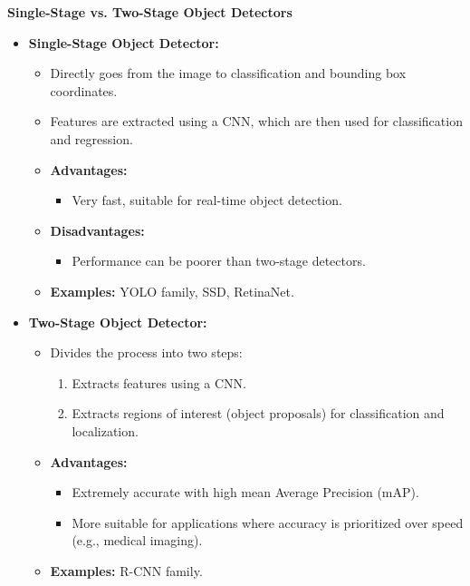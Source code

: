 \documentclass{beamer}
\begin{document}
\begin{frame}{\textbf{Single-Stage vs. Two-Stage Object Detectors}}
  \begin{itemize}
    \item \textbf{Single-Stage Object Detector:}
    \begin{itemize}
      \item Directly goes from the image to classification and bounding box coordinates.
      \item Features are extracted using a CNN, which are then used for classification and regression.
      \item \textbf{Advantages:}
      \begin{itemize}
        \item Very fast, suitable for real-time object detection.
      \end{itemize}
      \item \textbf{Disadvantages:}
      \begin{itemize}
        \item Performance can be poorer than two-stage detectors.
      \end{itemize}
      \item \textbf{Examples:} YOLO family, SSD, RetinaNet.
    \end{itemize}
    
    \item \textbf{Two-Stage Object Detector:}
    \begin{itemize}
      \item Divides the process into two steps:
      \begin{enumerate}
        \item Extracts features using a CNN.
        \item Extracts regions of interest (object proposals) for classification and localization.
      \end{enumerate}
      \item \textbf{Advantages:}
      \begin{itemize}
        \item Extremely accurate with high mean Average Precision (mAP).
        \item More suitable for applications where accuracy is prioritized over speed (e.g., medical imaging).
      \end{itemize}
      \item \textbf{Examples:} R-CNN family.
    \end{itemize}
  \end{itemize}
\end{frame}
\end{document}
